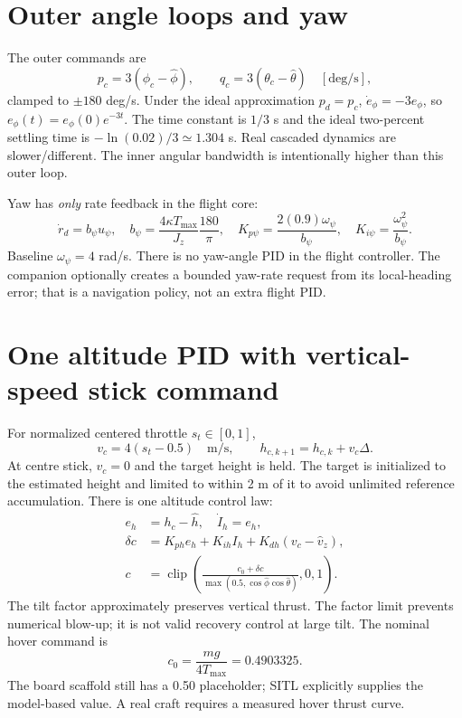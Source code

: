 \section{Outer angle loops and yaw}
The outer commands are
\begin{equation}
p_c=3(\phi_c-\hat\phi),\qquad q_c=3(\theta_c-\hat\theta)
\quad[\mathrm{deg/s}],
\end{equation}
clamped to $\pm180$ deg/s. Under the ideal approximation $p_d=p_c$,
$\dot e_\phi=-3e_\phi$, so $e_\phi(t)=e_\phi(0)e^{-3t}$.
The time constant is $1/3$ s and the ideal two-percent settling time is
$-\ln(0.02)/3\simeq1.304$ s. Real cascaded dynamics are slower/different.
The inner angular bandwidth is intentionally higher than this outer loop.

Yaw has \emph{only} rate feedback in the flight core:
\begin{equation}
\dot r_d=b_\psi u_\psi,\quad
b_\psi=\frac{4\kappa T_{\max}}{J_z}\frac{180}{\pi},\quad
K_{p\psi}=\frac{2(0.9)\omega_\psi}{b_\psi},\quad
K_{i\psi}=\frac{\omega_\psi^2}{b_\psi}.
\end{equation}
Baseline $\omega_\psi=4$ rad/s. There is no yaw-angle PID in the flight
controller. The companion optionally creates a bounded yaw-rate request from
its local-heading error; that is a navigation policy, not an extra flight PID.

\section{One altitude PID with vertical-speed stick command}
For normalized centered throttle $s_t\in[0,1]$,
\begin{equation}
v_c=4(s_t-0.5)\quad\mathrm{m/s},\qquad
h_{c,k+1}=h_{c,k}+v_c\Delta.
\end{equation}
At centre stick, $v_c=0$ and the target height is held. The target is initialized
to the estimated height and limited to within 2 m of it to avoid unlimited
reference accumulation. There is one altitude control law:
\begin{align}
e_h&=h_c-\hat h,\quad\dot I_h=e_h,\\
\delta c&=K_{ph}e_h+K_{ih}I_h+K_{dh}(v_c-\hat v_z),\\
c&=\operatorname{clip}\left(\frac{c_0+\delta c}
 {\max(0.5,\cos\hat\phi\cos\hat\theta)},0,1\right).
\end{align}
The tilt factor approximately preserves vertical thrust. The factor limit
prevents numerical blow-up; it is not valid recovery control at large tilt.
The nominal hover command is
\begin{equation}c_0=\frac{mg}{4T_{\max}}=0.4903325.\end{equation}
The board scaffold still has a 0.50 placeholder; SITL explicitly supplies
the model-based value. A real craft requires a measured hover thrust curve.

